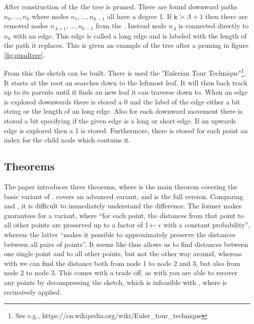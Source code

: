 After construction of the \qt{} the tree is pruned. There are found downward paths $n_0,...,n_k$ where nodes $n_1,...,n_{k-1}$ all have a degree 1. If \ensuremath{\texttt{k} > \Lambda+1} then there are removed nodes $n_{\Lambda+1},...,n_{k-1}$ from the \qt{}. Instead node $n_{\Lambda}$ is connected directly to $n_{k}$ with an edge. This edge is called a long edge and is labeled with the length of the path it replaces. This is given an example of the tree after a pruning in figure \ref{fig:quadtree}.


From this the sketch can be built. There is used the "Eulerian Tour Technique"\footnote{See e.g., https://en.wikipedia.org/wiki/Euler\_tour\_technique}.
It starts at the root an searches down to the leftmost leaf. It will then back track up to its parents until it finds an new leaf it can traverse down to. When an edge is explored downwards there is stored a 0 and the label of the edge either a bit string or the length of an long edge. Also for each downward movement there is stored a bit specifying if the given edge is a long or short edge. If an upwards edge is explored then a 1 is stored. Furthermore, there is stored for each point an index for the child node which contains it.

\subsection{Theorems}
The paper introduces three theorems, where  is the main theorem covering the basic variant of \qs{}.  covers an advanced variant, and  is the full version. Comparing  and , it is difficult to immediately understand the difference. The former makes guarantees for a \qs{} variant, where “for each point, the distances from that point to all other points are preserved up to a factor of 1+- $\epsilon$ with a constant probability”, whereas the latter “makes it possible to approximately preserve the distances between all pairs of points”. It seems like  thus allows us to find distances between one single point and to all other points, but not the other way around, whereas with  we can find the distance both from node 1 to node 2 and 3, but also from node 2 to node 3. This comes with a trade off, as with  you are able to recover any points by decompressing the sketch, which is infeasible with , where \qs{} is recursively applied.